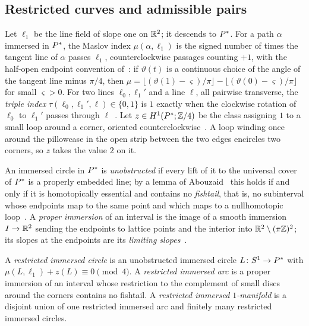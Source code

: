 \subsection{Restricted curves and admissible pairs}\label{ss:restricted}
Let $\ell_1$ be the line field of slope one on $\mathbb{R}^2$; it descends to $P^{*}$. For a path $\alpha$ immersed in
$P^{*}$, the Maslov index $\mu(\alpha,\ell_1)$ is the signed number of times the tangent line of $\alpha$ passes
$\ell_1$, counterclockwise passages counting $+1$, with the half-open endpoint convention
of~\cite[\S2.3]{HHK2}: if $\vartheta(t)$ is a continuous choice of the angle of the tangent line minus $\pi/4$,
then $\mu=\lfloor(\vartheta(1)-\varsigma)/\pi\rfloor-\lfloor(\vartheta(0)-\varsigma)/\pi\rfloor$ for small $\varsigma>0$.
For two lines $\ell_0,\ell_1'$ and a line $\ell$, all pairwise transverse, the \emph{triple index}
$\tau(\ell_0,\ell_1',\ell)\in\{0,1\}$ is $1$ exactly when the clockwise rotation of $\ell_0$ to $\ell_1'$ passes
through $\ell$~\cite[Def.~2.5]{HHK2}. Let $z\in H^1(P^{*};\mathbb{Z}/4)$ be the class assigning $1$ to a small loop
around a corner, oriented counterclockwise~\cite[Def.~3.1]{HHK2}. A loop winding once around the
pillowcase in the open strip between the two edges encircles two corners, so $z$ takes the value $2$ on
it.

An immersed circle in $P^{*}$ is \emph{unobstructed} if every lift of it to the universal cover of $P^{*}$ is a
properly embedded line; by a lemma of Abouzaid~\cite[Lemma~2.2]{Abouzaid} this holds if and only if it
is homotopically essential and contains no \emph{fishtail}, that is, no subinterval whose endpoints map to
the same point and which maps to a nullhomotopic loop~\cite[Def.~2.1]{HHK2}. A \emph{proper immersion}
of an interval is the image of a smooth immersion $I\to\mathbb{R}^2$ sending the endpoints to lattice points and
the interior into $\mathbb{R}^2\setminus(\pi\mathbb{Z})^2$; its slopes at the endpoints are its \emph{limiting
slopes}~\cite[Def.~3.3]{HHK2}.

\begin{definition}\label{def:restricted}
A \emph{restricted immersed circle} is an unobstructed immersed circle $L\colon S^1\to P^{*}$ with
$\mu(L,\ell_1)+z(L)\equiv0\pmod4$. A \emph{restricted immersed arc} is a proper immersion of an interval
whose restriction to the complement of small discs around the corners contains no fishtail. A
\emph{restricted immersed $1$-manifold} is a disjoint union of one restricted immersed arc and finitely
many restricted immersed circles.
\end{definition}

